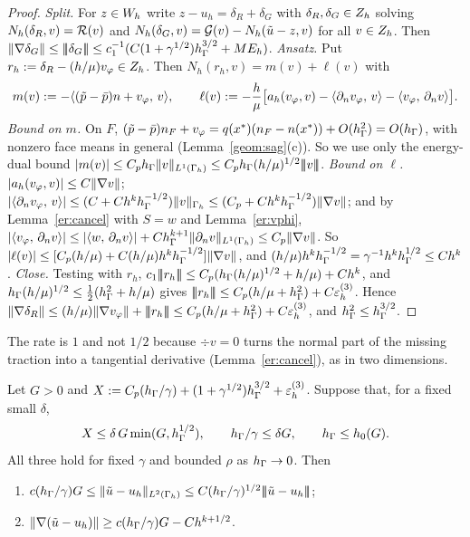 \begin{proof}
\emph{Split.} For $z\in W_h$ write $z-u_h=\delta_R+\delta_G$ with $\delta_R,\delta_G\in Z_h$ solving $N_h(\delta_R,v)=\mathcal R(v)$ and $N_h(\delta_G,v)=\mathcal G(v)-N_h(\tilde u-z,v)$ for all $v\in Z_h$. Then $\lVert \nabla\delta_G\rVert\le|\!|\!|\delta_G|\!|\!|\le c_1^{-1}(C(1+\gamma^{1/2})h_\Gamma^{3/2}+ME_h)$.
\emph{Ansatz.} Put $r_h:=\delta_R-(h/\mu)v_\varphi\in Z_h$. Then $N_h(r_h,v)=m(v)+\ell(v)$ with
\[
m(v):=-\langle (\tilde p-\bar p)n+v_\varphi,\, v\rangle,\qquad\ell(v):=-\frac h\mu\bigl[a_h(v_\varphi,v)-\langle \partial_n v_\varphi,\, v\rangle-\langle v_\varphi,\, \partial_n v\rangle\bigr].
\]
\emph{Bound on $m$.} On $F$, $(\tilde p-\bar p)n_F+v_\varphi=q(x^\ast)(n_F-n(x^\ast))+O(h_\Gamma^2)=O(h_\Gamma)$, with nonzero face means in general (Lemma~\ref{geom:sag}(c)). So we use only the energy-dual bound $|m(v)|\le C_ph_\Gamma\lVert v\rVert_{L^1(\Gamma_h)}\le C_ph_\Gamma(h/\mu)^{1/2}|\!|\!|v|\!|\!|$.
\emph{Bound on $\ell$.} $|a_h(v_\varphi,v)|\le C\lVert \nabla v\rVert$; $|\langle \partial_n v_\varphi,\, v\rangle|\le(C+Ch^kh_\Gamma^{-1/2})\lVert v\rVert_{\Gamma_h}\le(C_p+Ch^kh_\Gamma^{-1/2})\lVert \nabla v\rVert$; and by Lemma~\ref{er:cancel} with $S=w$ and Lemma~\ref{er:vphi}, $|\langle v_\varphi,\, \partial_n v\rangle|\le|\langle w,\, \partial_n v\rangle|+Ch_\Gamma^{k+1}\lVert \partial_n v\rVert_{L^1(\Gamma_h)}\le C_p\lVert \nabla v\rVert$. So $|\ell(v)|\le[C_p(h/\mu)+C(h/\mu)h^kh_\Gamma^{-1/2}]\lVert \nabla v\rVert$, and $(h/\mu)h^kh_\Gamma^{-1/2}=\gamma^{-1}h^kh_\Gamma^{1/2}\le Ch^k$.
\emph{Close.} Testing with $r_h$, $c_1|\!|\!|r_h|\!|\!|\le C_p(h_\Gamma(h/\mu)^{1/2}+h/\mu)+Ch^k$, and $h_\Gamma(h/\mu)^{1/2}\le\frac12(h_\Gamma^2+h/\mu)$ gives $|\!|\!|r_h|\!|\!|\le C_p(h/\mu+h_\Gamma^2)+C\varepsilon_h^{(3)}$. Hence $\lVert \nabla\delta_R\rVert\le(h/\mu)\lVert \nabla v_\varphi\rVert+|\!|\!|r_h|\!|\!|\le C_p(h/\mu+h_\Gamma^2)+C\varepsilon_h^{(3)}$, and $h_\Gamma^2\le h_\Gamma^{3/2}$.
\end{proof}

The rate is $1$ and not $1/2$ because $\div v=0$ turns the normal part of the missing traction into a tangential derivative (Lemma~\ref{er:cancel}), as in two dimensions.

\begin{theorem}\label{er:B}
Let $G>0$ and $X:=C_p(h_\Gamma/\gamma)+(1+\gamma^{1/2})h_\Gamma^{3/2}+\varepsilon_h^{(3)}$. Suppose that, for a fixed small $\delta$,
\[
X\le\delta\,G\min(G,h_\Gamma^{1/2}),\qquad h_\Gamma/\gamma\le\delta G,\qquad h_\Gamma\le h_0(G).
\]
All three hold for fixed $\gamma$ and bounded $\rho$ as $h_\Gamma\to0$. Then
\begin{enumerate}[label=(\roman*)]
\item $c(h_\Gamma/\gamma)G\le\lVert \tilde u-u_h\rVert_{L^2(\Gamma_h)}\le C(h_\Gamma/\gamma)^{1/2}|\!|\!|\tilde u-u_h|\!|\!|$;
\item $\lVert \nabla(\tilde u-u_h)\rVert\ge c(h_\Gamma/\gamma)G-Ch^{k+1/2}$.
\end{enumerate}
\end{theorem}

